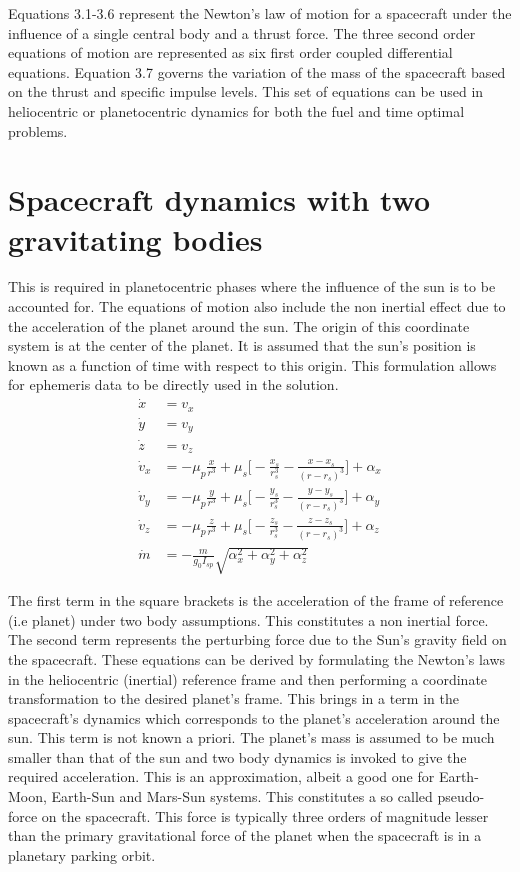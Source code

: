 Equations 3.1-3.6 represent the Newton's law of motion for a spacecraft under the influence of a single central body and a thrust force. The three second order equations of motion are represented as six first order coupled differential equations. Equation 3.7 governs the variation of the mass of the spacecraft based on the thrust and specific impulse levels. This set of equations can be used in heliocentric or planetocentric dynamics for both the fuel and time optimal problems. 

\section{Spacecraft dynamics with two gravitating bodies}
This is required in planetocentric phases where the influence of the sun is to be accounted for. The equations of motion also include the non inertial effect due to the acceleration of the planet around the sun. The origin of this coordinate system is at the center of the planet. It is assumed that the sun's position is known as a function of time with respect to this origin. This formulation allows for ephemeris data to be directly used in the solution.
\begin{align}
	\dot{x}&=v_x\\
	\dot{y}&=v_y\\
	\dot{z}&=v_z\\
	\dot{v}_x&=-\mu_p\frac{x}{r^3}+\mu_s\bigg[-\frac{x_s}{r_s^3}-\frac{x-x_s}{(r-r_s)^3}\bigg]+\alpha_x\\
	\dot{v}_y&=-\mu_p\frac{y}{r^3}+\mu_s\bigg[-\frac{y_s}{r_s^3}-\frac{y-y_s}{(r-r_s)^3}\bigg]+\alpha_y\\
	\dot{v}_z&=-\mu_p\frac{z}{r^3}+\mu_s\bigg[-\frac{z_s}{r_s^3}-\frac{z-z_s}{(r-r_s)^3}\bigg]+\alpha_z\\
	\dot{m}&=-\frac{m}{g_0 I_{sp}}\sqrt{\alpha_x^2+\alpha_y^2+\alpha_z^2}
\end{align}

The first term in the square brackets is the acceleration of the frame of reference (i.e planet) under two body assumptions. This constitutes a non inertial force. The second term represents the perturbing force due to the Sun's gravity field on the spacecraft. These equations can be derived by formulating the Newton's laws in the heliocentric (inertial) reference frame and then performing a coordinate transformation to the desired planet's frame. This brings in a term in the spacecraft's dynamics which corresponds to the planet's acceleration around the sun. This term is not known a priori. The planet's mass is assumed to be much smaller than that of the sun and two body dynamics is invoked to give the required acceleration. This is an approximation, albeit a good one for Earth-Moon, Earth-Sun and Mars-Sun systems. This constitutes a so called pseudo-force on the spacecraft. This force is typically three orders of magnitude lesser than the primary gravitational force of the planet when the spacecraft is in a planetary parking orbit.

